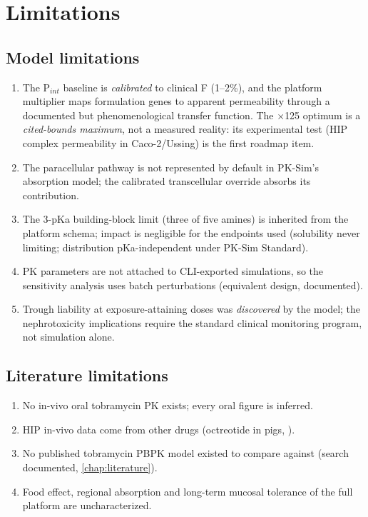 \section{Limitations}
\label{sec:ch5-limits}
\subsection{Model limitations}
\begin{enumerate}
\item The P$_{int}$ baseline is \emph{calibrated} to clinical F (1--2\%), and the platform multiplier maps formulation genes to apparent permeability through a documented but phenomenological transfer function. The $\times$125 optimum is a \emph{cited-bounds maximum}, not a measured reality: its experimental test (HIP complex permeability in Caco-2/Ussing) is the first roadmap item.
\item The paracellular pathway is not represented by default in PK-Sim's absorption model; the calibrated transcellular override absorbs its contribution.
\item The 3-pKa building-block limit (three of five amines) is inherited from the platform schema; impact is negligible for the endpoints used (solubility never limiting; distribution pKa-independent under PK-Sim Standard).
\item PK parameters are not attached to CLI-exported simulations, so the sensitivity analysis uses batch perturbations (equivalent design, documented).
\item Trough liability at exposure-attaining doses was \emph{discovered} by the model; the nephrotoxicity implications require the standard clinical monitoring program, not simulation alone.
\end{enumerate}

\subsection{Literature limitations}
\begin{enumerate}
\item No in-vivo oral tobramycin PK exists; every oral figure is inferred.
\item HIP in-vivo data come from other drugs (octreotide in pigs, \citealp{Bonengel2018}).
\item No published tobramycin PBPK model existed to compare against (search documented, \cref{chap:literature}).
\item Food effect, regional absorption and long-term mucosal tolerance of the full platform are uncharacterized.
\end{enumerate}

